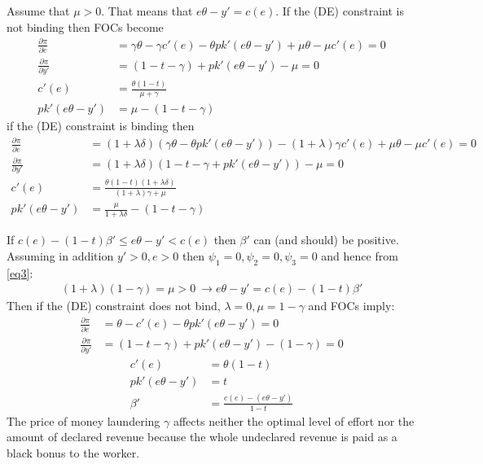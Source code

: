 \documentclass[a4paper]{article}
\begin{document}
Assume that $\mu > 0$. That means that $e\theta - y' = c(e)$. If the (DE) constraint is not binding then FOCs become
\begin{align*}
\frac{\partial \pi}{\partial e} &= \gamma \theta- \gamma c'(e) - \theta p k'(e \theta - y') + \mu \theta - \mu c'(e) = 0\\
\frac{\partial \pi}{\partial y'} &= (1 - t - \gamma)+pk'(e\theta - y') - \mu  = 0\\
c'(e) &= \frac{\theta(1 - t)}{\mu + \gamma}\\
pk'(e\theta - y') &= \mu - (1 - t - \gamma)
\end{align*}
if the (DE) constraint is binding then 
\begin{align*}
\frac{\partial \pi}{\partial e} &= (1 + \lambda \delta)(\gamma \theta - \theta p k'(e \theta - y')) - (1+\lambda) \gamma c'(e)+ \mu \theta - \mu c'(e) = 0\\
\frac{\partial \pi}{\partial y'} &= (1+\lambda \delta)(1 - t - \gamma+pk'(e\theta - y')) - \mu = 0\\
c'(e) &= \frac{\theta(1-t)(1+\lambda \delta)}{(1 + \lambda)\gamma + \mu}\\
pk'(e\theta - y') &= \frac{\mu}{1+\lambda \delta} - (1 - t- \gamma)
\end{align*}


If $c(e) - (1-t)\beta' \le e \theta - y' < c(e)$ then $\beta'$ can (and should) be positive.
Assuming in addition $y' > 0, e > 0$ then $\psi_1 = 0, \psi_2 = 0, \psi_3= 0$ and hence from \eqref{eq3}:
\begin{align*}
(1 + \lambda)(1 - \gamma) = \mu > 0\ \to e \theta - y' = c(e) - (1 - t)\beta'
\end{align*}
Then if the (DE) constraint does not bind, $\lambda = 0, \mu = 1 - \gamma$ and FOCs imply:
\begin{align*}
\frac{\partial \pi}{\partial e} &= \theta - c'(e) - \theta p k'(e\theta - y') = 0\\
\frac{\partial \pi}{\partial y'} &= (1 - t - \gamma)+pk'(e\theta - y') - (1-\gamma) = 0
\end{align*}
\begin{align*}
c'(e) &= \theta(1 - t)\\
pk'(e\theta - y') &= t\\
\beta' &= \frac{c(e) - (e\theta - y')}{1-t}
\end{align*}
The price of money laundering $\gamma$ affects neither the optimal level of effort nor the amount of declared revenue because the whole undeclared revenue is paid as a black bonus to the worker.
\end{document}
